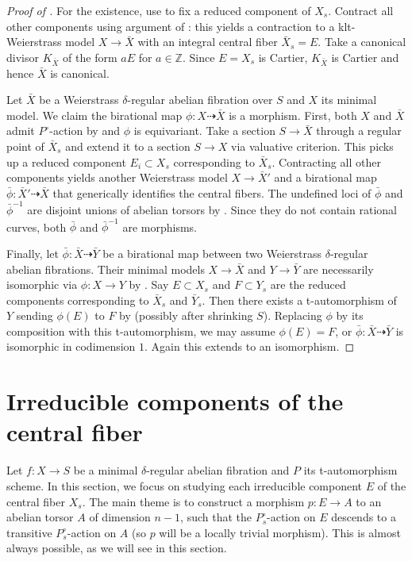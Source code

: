 \documentclass[reqno, letterpaper]{amsart}
\numberwithin{equation}{subsection}
\let\to\longrightarrow
\newcommand{\ZZ}{\mathbb{Z}}
\begin{document}
		\begin{proof}[Proof of ]
			For the existence, use  to fix a reduced component of $X_s$. Contract all other components using argument of : this yields a contraction to a klt-Weierstrass model $X \to \bar X$ with an integral central fiber $\bar X_s = E$. Take a canonical divisor $K_{\bar X}$ of the form $aE$ for $a \in \ZZ$. Since $E = X_s$ is Cartier, $K_{\bar X}$ is Cartier and hence $\bar X$ is canonical.
			
			\medskip
			
			Let $\bar X$ be a Weierstrass $\delta$-regular abelian fibration over $S$ and $X$ its minimal model. We claim the birational map $\phi : X \dashrightarrow \bar X$ is a morphism. First, both $X$ and $\bar X$ admit $P^\circ$-action by  and $\phi$ is equivariant. Take a section $S \to \bar X$ through a regular point of $\bar X_s$ and extend it to a section $S \to X$ via valuative criterion. This picks up a reduced component $E_i \subset X_s$ corresponding to $\bar X_s$. Contracting all other components yields another Weierstrass model $X \to \bar X'$ and a birational map $\bar \phi : \bar X' \dashrightarrow \bar X$ that generically identifies the central fibers. The undefined loci of $\bar \phi$ and $\bar \phi^{-1}$ are disjoint unions of abelian torsors by . Since they do not contain rational curves, both $\bar \phi$ and $\bar \phi^{-1}$ are morphisms.
			
			\medskip
			
			Finally, let $\bar \phi : \bar X \dashrightarrow \bar Y$ be a birational map between two Weierstrass $\delta$-regular abelian fibrations. Their minimal models $X \to \bar X$ and $Y \to \bar Y$ are necessarily isomorphic via $\phi : X \to Y$ by . Say $E \subset X_s$ and $F \subset Y_s$ are the reduced components corresponding to $\bar X_s$ and $\bar Y_s$. Then there exists a t-automorphism of $Y$ sending $\phi(E)$ to $F$ by  (possibly after shrinking $S$). Replacing $\phi$ by its composition with this t-automorphism, we may assume $\phi(E) = F$, or $\bar \phi : \bar X \dashrightarrow \bar Y$ is isomorphic in codimension $1$. Again this extends to an isomorphism.
		\end{proof}
		
		
		
\section{Irreducible components of the central fiber} \label{sec:irreducible component}
	Let $f : X \to S$ be a minimal $\delta$-regular abelian fibration and $P$ its t-automorphism scheme. In this section, we focus on studying each irreducible component $E$ of the central fiber $X_s$. The main theme is to construct a morphism $p : E \to A$ to an abelian torsor $A$ of dimension $n-1$, such that the $P^\circ_s$-action on $E$ descends to a transitive $P^\circ_s$-action on $A$ (so $p$ will be a locally trivial morphism). This is almost always possible, as we will see in this section.
	
\end{document}

